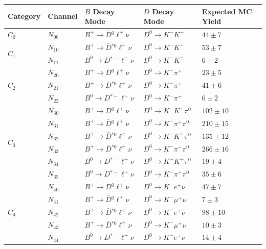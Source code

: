 \begin{table}[H]
	\centering
	\begin{tabular}{l|l|l|l|l}
		Category & Channel & $B$ Decay Mode & $D$ Decay Mode & Expected MC Yield \\
		\toprule
		
		$C_0$ & $N_{00}$ &  $B^+ \to \bar D {}^{0} \ell^+ \nu$ & $D^0 \to K^-K^+$ & $44\pm7$\\
		\midrule
		
		\multirow{2}{*}{$C_1$} & $N_{10}$ & $B^+ \to \bar D {}^{*0} \ell^+ \nu$ & $D^0 \to K^-K^+$ & $53\pm7$\\
		& $N_{11}$ & $B^0 \to D {}^{*-} \ell^+ \nu$  & $D^0 \to K^-K^+$ & $6\pm2$\\
		\midrule
		
		\multirow{3}{*}{$C_2$} & $N_{20}$ & $B^+ \to \bar D {}^{0} \ell^+ \nu$ & $D^0 \to K^-\pi^+$ & $23\pm5$\\
		& $N_{21}$ & $B^+ \to \bar D {}^{*0} \ell^+ \nu$  & $D^0 \to K^-\pi^+$ & $41\pm6$\\
		& $N_{22}$ & $B^0 \to D {}^{*-} \ell^+ \nu$  & $D^0 \to K^-\pi^+$ & $6\pm2$\\
		\midrule
		\multirow{6}{*}{$C_3$} & $N_{30}$ & $B^+ \to \bar D {}^{0} \ell^+ \nu$ & $D^0 \to K^-K^+\pi^0$ & $102\pm10$\\
		& $N_{31}$ & $B^+ \to \bar D {}^{0} \ell^+ \nu$ & $D^0 \to K^-\pi^+\pi^0$ & $210\pm15$\\
		& $N_{32}$ & $B^+ \to \bar D {}^{*0} \ell^+ \nu$ & $D^0 \to K^-K^+\pi^0$ & $135\pm12$\\
		& $N_{33}$ & $B^+ \to \bar D {}^{*0} \ell^+ \nu$ & $D^0 \to K^-\pi^+\pi^0$ & $266\pm16$\\
		& $N_{34}$ & $B^0 \to D {}^{*-} \ell^+ \nu$ & $D^0 \to K^-K^+\pi^0$ & $19\pm4$\\
		& $N_{35}$ & $B^0 \to D {}^{*-} \ell^+ \nu$ & $D^0 \to K^-\pi^+\pi^0$ & $35\pm6$\\
		\midrule
		\multirow{6}{*}{$C_4$} & $N_{40}$ & $B^+ \to \bar D {}^{0} \ell^+ \nu$ & $D^0 \to K^-e^+\nu$ & $47\pm7$\\
		& $N_{41}$ & $B^+ \to \bar D {}^{0} \ell^+ \nu$ & $D^0 \to K^-\mu^+\nu$ & $7\pm3$\\
		& $N_{42}$ & $B^+ \to \bar D {}^{*0} \ell^+ \nu$ & $D^0 \to K^-e^+\nu$ & $98\pm10$\\
		& $N_{43}$ & $B^+ \to \bar D {}^{*0} \ell^+ \nu$ & $D^0 \to K^-\mu^+\nu$ & $10\pm3$\\
		& $N_{44}$ & $B^0 \to D {}^{*-} \ell^+ \nu$ & $D^0 \to K^-e^+\nu$ & $14\pm4$\\

\end{tabular}
\end{table}
